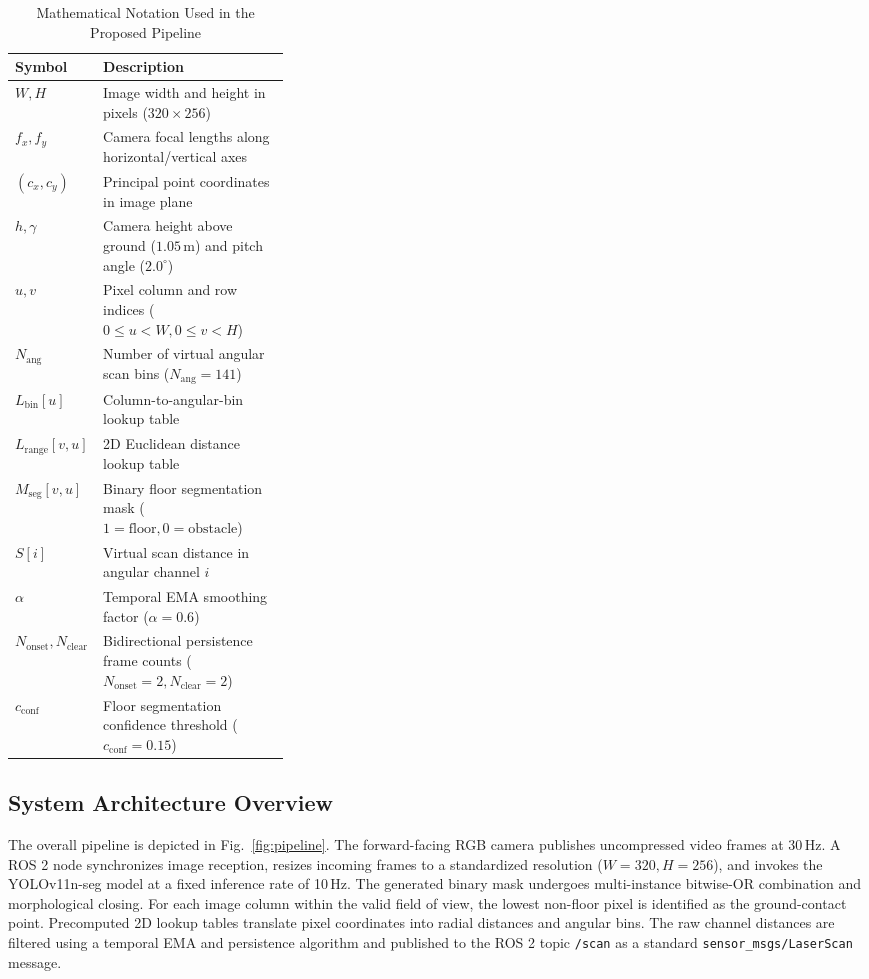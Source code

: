 \documentclass{ieeeaccess}
\begin{document}
\begin{table}[t]
  \centering
  \caption{Mathematical Notation Used in the Proposed Pipeline}
  \label{tab:notation}
  \begin{tabularx}{\linewidth}{@{}p{0.32\linewidth}X@{}}
    \toprule
    Symbol & Description \\
    \midrule
    $W, H$ & Image width and height in pixels ($320 \times 256$) \\
    $f_x, f_y$ & Camera focal lengths along horizontal/vertical axes \\
    $(c_x, c_y)$ & Principal point coordinates in image plane \\
    $h, \gamma$ & Camera height above ground ($1.05$\,m) and pitch angle ($2.0^\circ$) \\
    $u, v$ & Pixel column and row indices ($0 \le u < W, 0 \le v < H$) \\
    $N_{\mathrm{ang}}$ & Number of virtual angular scan bins ($N_{\mathrm{ang}} = 141$) \\
    $L_{\mathrm{bin}}[u]$ & Column-to-angular-bin lookup table \\
    $L_{\mathrm{range}}[v, u]$ & 2D Euclidean distance lookup table \\
    $M_{\mathrm{seg}}[v, u]$ & Binary floor segmentation mask ($1=\text{floor}, 0=\text{obstacle}$) \\
    $S[i]$ & Virtual scan distance in angular channel $i$ \\
    $\alpha$ & Temporal EMA smoothing factor ($\alpha = 0.6$) \\
    $N_{\mathrm{onset}}, N_{\mathrm{clear}}$ & Bidirectional persistence frame counts ($N_{\mathrm{onset}}=2, N_{\mathrm{clear}}=2$) \\
    $c_{\mathrm{conf}}$ & Floor segmentation confidence threshold ($c_{\mathrm{conf}} = 0.15$) \\
    \bottomrule
  \end{tabularx}
\end{table}

\subsection{System Architecture Overview}
The overall pipeline is depicted in Fig.~\ref{fig:pipeline}. The forward-facing RGB camera publishes uncompressed video frames at 30\,Hz. A ROS 2 node synchronizes image reception, resizes incoming frames to a standardized resolution ($W=320, H=256$), and invokes the YOLOv11n-seg model at a fixed inference rate of 10\,Hz. The generated binary mask undergoes multi-instance bitwise-OR combination and morphological closing. For each image column within the valid field of view, the lowest non-floor pixel is identified as the ground-contact point. Precomputed 2D lookup tables translate pixel coordinates into radial distances and angular bins. The raw channel distances are filtered using a temporal EMA and persistence algorithm and published to the ROS 2 topic \texttt{/scan} as a standard \texttt{sensor\_msgs/LaserScan} message.
\end{document}
